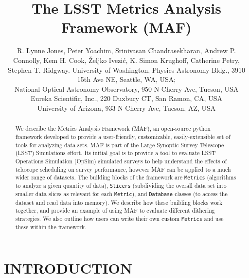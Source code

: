 \documentclass[]{spie}  %
\title{The LSST Metrics Analysis Framework (MAF)}
\author{R. Lynne Jones\supit{a}, Peter Yoachim\supit{a}, Srinivasan
  Chandrasekharan\supit{b}, Andrew P. Connolly\supit{a}, Kem
  H. Cook\supit{c}, {\v Z}eljko Ivezi{\'c}\supit{a},  K. Simon Krughoff\supit{a}, Catherine Petry\supit{d}, Stephen T. Ridgway\supit{b}.
\skiplinehalf
\supit{a}University of Washington, Physics-Astronomy Bldg., 3910 15th
Ave NE,  Seattle, WA, USA; \\
\supit{b}National Optical Astronomy Observatory, 950 N Cherry Ave, Tucson,
USA\\
\supit{c}Eureka Scientific, Inc., 220 Duxbury CT, San Ramon, CA, USA\\
\supit{d}University of Arizona, 933 N Cherry Ave, Tucson, AZ, USA\\
}
\begin{document}
 

  \maketitle 



\begin{abstract}
We describe the Metrics Analysis Framework (MAF), an open-source
python framework developed to provide a user-friendly, customizable,
easily-extensible set of tools for analyzing data sets. MAF is part of
the Large Synoptic Survey Telescope (LSST) Simulations effort. Its
initial goal is to provide a tool to evaluate LSST Operations
Simulation (OpSim) simulated surveys to help understand the effects of
telescope scheduling on survey performance, however MAF can be applied
to a much wider range of datasets. The building blocks of the
framework are {\tt Metrics} (algorithms to analyze a given quantity of data),
{\tt Slicers}
(subdividing the overall data set into smaller data slices as relevant
for each {\tt Metric}), and {\tt Database} classes (to access the dataset and read
data into memory). We describe how these building blocks work
together, and provide an example of using MAF to evaluate different
dithering strategies. We also outline how users can write their own
custom {\tt Metrics} and use these within the framework. 
\end{abstract}


\section{INTRODUCTION}
\label{sec:intro}  
\end{document}
